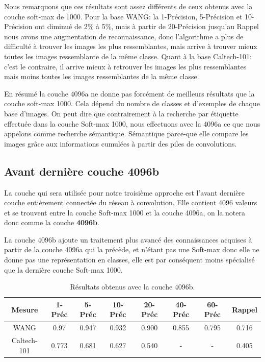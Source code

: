 	Nous remarquons que ces résultats sont assez différents de ceux obtenus avec la couche soft-max de 1000. Pour la base WANG: la 1-Précision, 5-Précision et 10-Précision ont diminué de 2\% à 5\%, mais à partir de 20-Précision jusqu'au Rappel nous avons une augmentation de reconnaissance, donc l'algorithme a plus de difficulté à trouver les images les plus ressemblantes, mais arrive à trouver mieux toutes les images ressemblante de la même classe.
	Quant à la base Caltech-101: c'est le contraire, il arrive mieux à retrouver les images les plus ressemblantes mais moins toutes les images ressemblantes de la même classe.
	
	En résumé la couche 4096a ne donne pas forcément de meilleurs résultats que la couche soft-max 1000. Cela dépend du nombre de classes et d'exemples de chaque base d'images. On peut dire que contrairement à la recherche par étiquette effectuée dans la couche Soft-max 1000, nous effectuons avec la 4096a ce que nous appelons comme recherche sémantique. Sémantique parce-que elle compare les images grâce aux informations cumulées à partir des piles de convolutions.


\subsection{Avant dernière couche 4096b}
	La couche qui sera utilisée pour notre troisième approche est l'avant dernière couche entièrement connectée du réseau à convolution. Elle contient 4096 valeurs et se trouvent entre la couche Soft-max 1000 et la couche 4096a, on la notera donc comme la couche \textbf{4096b}.
	
	La couche 4096b ajoute un traitement plus avancé des connaissances acquises à partir de la couche 4096a qui la précède, et n'étant pas une Soft-max donc elle ne donne pas une représentation en classes, elle est par conséquent moins spécialisé que la dernière couche Soft-max 1000.


\begin{table}[H]
\begin{center}
\begin{tabular}{|c|c|c|c|c|c|c|c|}
\hline
	Mesure & 1-Préc & 5-Préc & 10-Préc & 20-Préc & 40-Préc & 60-Préc & Rappel\\
\hline
	WANG & 0.97 & 0.947 & 0.932 & 0.900 & 0.855 & 0.795 & 0.716\\
\hline
	Caltech-101 & 0.773 & 0.681 & 0.627 & 0.540 & - & - & 0.405\\
\hline
\end{tabular}
\end{center}
\caption{Résultats obtenus avec la couche 4096b.}
\end{table}

